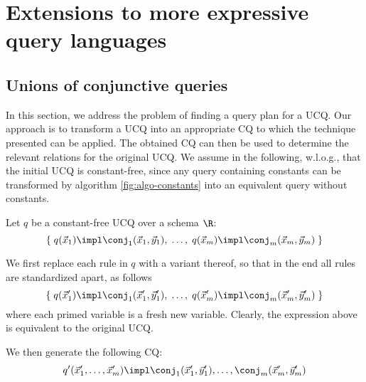 \section{Extensions to more expressive query languages}\label{sec:extensions}

\subsection{Unions of conjunctive queries}
In this section, we address the problem of finding a query plan for a UCQ.
Our approach is to transform a UCQ into an appropriate CQ to which the technique presented can be applied.
The obtained CQ can then be used to determine the relevant relations for the original UCQ.
We assume in the following, w.l.o.g., that the initial UCQ is constant-free, since any query containing constants can be transformed by  algorithm \ref{fig:algo-constants} into an equivalent query without constants.

Let $q$ be a constant-free UCQ over a schema $\R$: %
%
$$
\{\;  q(\vec x_{1}) \impl
\conj_{1}(\vec x_1,\vec y_1),\;
  \ldots,
  \;q(\vec x_m) \impl
\conj_{m}(\vec x_m,\vec y_m) \;\}
$$


% 
We first replace each rule in $q$ with a variant thereof, so that in the end all
rules are standardized apart, as follows
%
$$
    \{\;  q(\vec x'_{1}) \impl
    \conj_{1}(\vec x'_1,\vec y'_1),
    \;  \ldots,\;
      q(\vec x'_m) \impl
    \conj_{m}(\vec x'_m,\vec y'_m) \;\}
$$
where each primed variable is a fresh new variable. Clearly, the expression
above is equivalent to the original UCQ.

We then generate the following CQ:
$$
    q'(\vec x'_{1},\ldots,\vec x'_m) \impl
    \conj_{1}(\vec x'_1,\vec y'_1),
    \ldots,
    \conj_{m}(\vec x'_m,\vec y'_m)
$$

